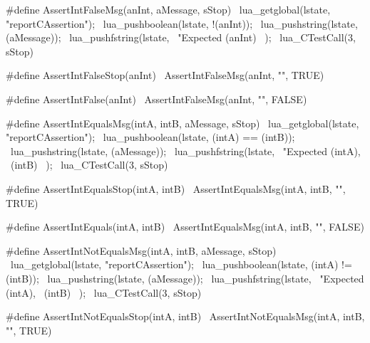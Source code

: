 \startTestSuite[assertIntFalse]

\startCHeader
#define AssertIntFalseMsg(anInt, aMessage, sStop) \
  lua_getglobal(lstate, "reportCAssertion");      \
  lua_pushboolean(lstate, !(anInt));              \
  lua_pushstring(lstate, (aMessage));             \
  lua_pushfstring(lstate,                         \
      "Expected %
      (anInt)                                     \
    );                                            \
  lua_CTestCall(3, sStop)

#define AssertIntFalseStop(anInt)    \
  AssertIntFalseMsg(anInt, "", TRUE)

#define AssertIntFalse(anInt)         \
  AssertIntFalseMsg(anInt, "", FALSE)
\stopCHeader

\stopTestSuite

\startTestSuite[assertIntEquals]

\startCHeader
#define AssertIntEqualsMsg(intA, intB, aMessage, sStop) \
  lua_getglobal(lstate, "reportCAssertion");            \
  lua_pushboolean(lstate, (intA) == (intB));            \
  lua_pushstring(lstate, (aMessage));                   \
  lua_pushfstring(lstate,                               \
      "Expected %
      (intA),                                           \
      (intB)                                            \
    );                                                  \
  lua_CTestCall(3, sStop)

#define AssertIntEqualsStop(intA, intB)    \
  AssertIntEqualsMsg(intA, intB, "", TRUE)

#define AssertIntEquals(intA, intB)         \
  AssertIntEqualsMsg(intA, intB, "", FALSE)
\stopCHeader

\stopTestSuite

\startTestSuite[assertIntNotEquals]

\startCHeader
#define AssertIntNotEqualsMsg(intA, intB, aMessage, sStop) \
  lua_getglobal(lstate, "reportCAssertion");               \
  lua_pushboolean(lstate, (intA) != (intB));               \
  lua_pushstring(lstate, (aMessage));                      \
  lua_pushfstring(lstate,                                  \
      "Expected %
      (intA),                                              \
      (intB)                                               \
    );                                                     \
  lua_CTestCall(3, sStop)

#define AssertIntNotEqualsStop(intA, intB)    \
  AssertIntNotEqualsMsg(intA, intB, "", TRUE)

